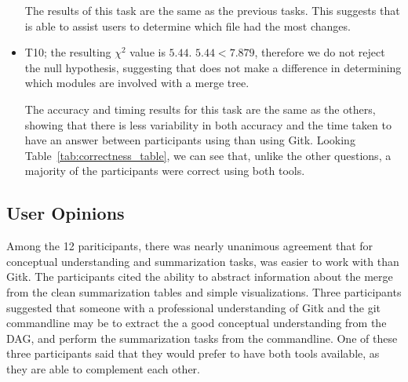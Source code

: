\begin{itemize}
    The results of this task are the same as the previous tasks.
    This suggests that \tool is able to assist users to determine which
    file had the most changes.

  \item

    T10; the resulting $\chi^2$ value is $5.44$. $5.44 < 7.879$,
    therefore we do not reject the null hypothesis, suggesting that
    \tool does not make a difference in determining which modules are
    involved with a merge tree.

    The accuracy and timing results for this task are the same as the
    others, showing that there is less variability in both accuracy and
    the time taken to have an answer between participants using \tool
    than using Gitk. Looking Table~\ref{tab:correctness_table}, we can
    see that, unlike the other questions, a majority of the participants
    were correct using both tools.

\end{itemize}

\subsection{User Opinions}
\label{sub:user_opinions}

Among the 12 pariticipants, there was nearly unanimous agreement that
for conceptual understanding and summarization tasks, \tool was easier
to work with than Gitk. The participants cited the ability to abstract
information about the merge from the clean summarization tables and
simple visualizations. Three participants suggested that someone with a
professional understanding of Gitk and the git commandline may be to
extract the a good conceptual understanding from the DAG, and perform
the summarization tasks from the commandline. One of these three
participants said that they would prefer to have both tools available,
as they are able to complement each other.

